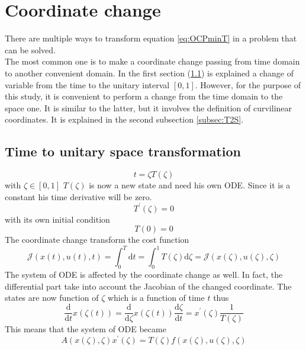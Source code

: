 \section{Coordinate change}
%
There are multiple ways to transform equation \ref{eq:OCPminT} in a problem that can be solved.\\
The most common one is to make a coordinate change passing from time domain to another convenient domain. In the first section (\ref{subsec:T21}) is explained a change of variable from the time to the unitary interval $[0,1]$. However, for the purpose of this study, it is convenient to perform a change from the time domain to the space one. It is similar to the latter, but it involves the definition of curvilinear coordinates. It is explained in the second subsection \ref{subsec:T2S}.
%
\subsection{Time to unitary space transformation}
\label{subsec:T21}
%
\begin{equation}
    t = \zeta T(\zeta) 
\end{equation}
%
with $\zeta \in [0,1]$
$T(\zeta)$ is now a new state and need his own ODE. Since it is a constant his time derivative will be zero.
%
\begin{equation}
    T^{\prime}(\zeta)=0
\end{equation}
%
with its own initial condition
%
\begin{equation}
    T(0)=0
\end{equation}
%
The coordinate change transform the cost function 
\begin{equation}
    \mathcal{J}(x(t), u(t), t) = \int_{0}^{T}  \mathrm{d} t = \int_{0}^{1} T(\zeta) \mathrm{d} \zeta = \mathcal{J}(x(\zeta), u(\zeta), \zeta) 
\end{equation}
%
The system of ODE is affected by the coordinate change as well. In fact, the differential part take into account the Jacobian of the changed coordinate. The states are now function of $\zeta$ which is a function of time $t$ thus 
%
\begin{equation}
    \frac{\mathrm{d}}{\mathrm{d}t} x(\zeta(t)) = \frac{\mathrm{d}}{\mathrm{d}\zeta} x(\zeta(t)) \frac{\mathrm{d} \zeta }{\mathrm{d}t} = x^\prime(\zeta) \frac{1}{T(\zeta)}
\end{equation}
%
This means that the system of ODE became
%
\begin{equation}
    A(x(\zeta), \zeta) x^{\prime}(\zeta) = T(\zeta) f(x(\zeta), u(\zeta), \zeta)
\end{equation}
%
